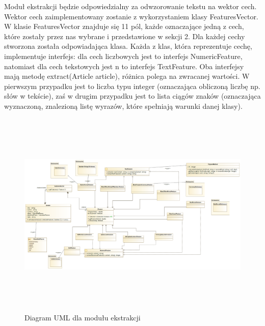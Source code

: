 \documentclass{classrep}
\begin{document}
\indent Moduł ekstrakcji będzie odpowiedzialny za odwzorowanie tekstu na wektor cech. Wektor cech zaimplementowany zostanie z wykorzystaniem klasy FeaturesVector. W klasie FeaturesVector znajduje się 11 pól, każde oznaczające jedną z cech, które zostały przez nas wybrane i przedstawione w sekcji 2. Dla każdej cechy stworzona została odpowiadająca klasa. Każda z klas, która reprezentuje cechę, implementuje interfejs: dla cech liczbowych jest to interfejs NumericFeature, natomiast dla cech tekstowych jest n to interfejs TextFeature.
Oba interfejsy mają metodę extract(Article article), różnica polega na zwracanej wartości. W pierwszym przypadku jest to liczba typu integer (oznaczająca obliczoną liczbę np. słów w tekście), zaś w drugim przypadku jest to lista ciągów znaków (oznaczająca wyznaczoną, znalezioną listę wyrazów, które spełniają warunki danej klasy).
\\
\begin{figure}[htp]
    \centering
    \includegraphics[width=15cm, height=10cm]{modul_ekstrakcji.png}
    \caption{Diagram UML dla modułu ekstrakcji}
\end{figure}
\end{document}
